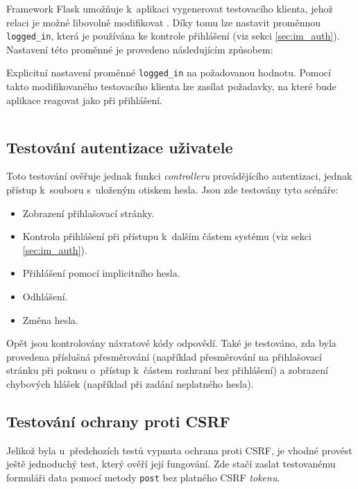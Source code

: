 Framework Flask umožňuje k~aplikaci vygenerovat testovacího klienta, jehož relaci je možné libovolně modifikovat \cite{flask_testing}. Díky tomu lze nastavit proměnnou \texttt{logged\_in}, která je používána ke kontrole přihlášení (viz sekci \ref{sec:im_auth}). Nastavení této proměnné je provedeno následujícím způsobem:

\begin{listing}[htbp]
\caption{\label{lst:logged_in} Explicitní nastavení proměnné \texttt{logged\_in} na požadovanou hodnotu. Pomocí takto modifikovaného testovacího klienta lze zasílat požadavky, na které bude aplikace reagovat jako při přihlášení.}
\inputminted[bgcolor=codebg]{python}{source-samples/logged_in.py}
\end{listing}

\subsection{Testování autentizace uživatele}

Toto testování ověřuje jednak funkci \textit{controlleru} provádějícího autentizaci, jednak přístup k~souboru s~uloženým otiskem hesla. Jsou zde testovány tyto scénáře:

\begin{itemize}
    \item Zobrazení přihlašovací stránky.
    \item Kontrola přihlášení při přístupu k~dalším částem systému (viz sekci \ref{sec:im_auth}).
    \item Přihlášení pomocí implicitního hesla.
    \item Odhlášení.
    \item Změna hesla.
\end{itemize}

Opět jsou kontrolovány návratové kódy odpovědí. Také je testováno, zda byla provedena příslušná přesměrování (například přesměrování na přihlašovací stránku při pokusu o~přístup k~částem rozhraní bez přihlášení) a zobrazení chybových hlášek (například při zadání neplatného hesla).

\subsection{Testování ochrany proti CSRF}
\label{sec:te_csrf}

Jelikož byla u~předchozích testů vypnuta ochrana proti CSRF, je vhodné provést ještě jednoduchý test, který ověří její fungování. Zde stačí zaslat testovanému formuláři data pomocí metody \texttt{post} bez platného CSRF \textit{tokenu}.


